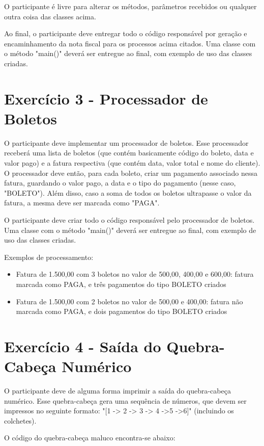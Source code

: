 O participante é livre para alterar os métodos, parâmetros recebidos ou qualquer outra coisa das classes acima.

Ao final, o participante deve entregar todo o código responsável por geração e encaminhamento da nota fiscal 
para os processos acima citados. Uma classe com o método "main()" deverá ser entregue ao final, com
exemplo de uso das classes criadas.

\section{Exercício 3 - Processador de Boletos}

O participante deve implementar um processador de boletos. Esse processador receberá uma lista de boletos 
(que contém basicamente código do boleto, data e valor pago) e a fatura respectiva (que contém data, valor total e nome do cliente). 
O processador deve então, para cada boleto, criar um pagamento associado nessa fatura,
guardando o valor pago, a data e o tipo do pagamento (nesse caso, "BOLETO").
Além disso, caso a soma de todos os boletos ultrapasse o valor da fatura, a mesma deve ser marcada
como "PAGA".

O participante deve criar todo o código responsável pelo processador de boletos. Uma classe com
o método "main()" deverá ser entregue ao final, com exemplo de uso das classes criadas.

Exemplos de processamento:

\begin{itemize}
	\item Fatura de 1.500,00 com 3 boletos no valor de 500,00, 400,00 e 600,00: fatura marcada como PAGA, e três pagamentos do tipo BOLETO criados 
	\item Fatura de 1.500,00 com 2 boletos no valor de 500,00 e 400,00: fatura não marcada como PAGA, e dois pagamentos do tipo BOLETO criados 
\end{itemize}

\section{Exercício 4 - Saída do Quebra-Cabeça Numérico}

O participante deve de alguma forma imprimir a saída do quebra-cabeça numérico. Esse quebra-cabeça gera
uma sequência de números, que devem ser impressos no seguinte formato: "[1 -> 2 -> 3 -> 4 ->5 ->6]" (incluindo os colchetes).

O código do quebra-cabeça maluco encontra-se abaixo:

